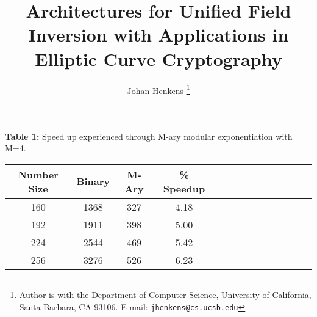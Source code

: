 \documentclass[twocolumn]{IEEEtran}
\begin{document}
\title{Architectures for Unified Field Inversion with Applications 
in Elliptic Curve Cryptography}


\author{Johan Henkens
\thanks{Author is with the
Department of Computer Science,
University of California, Santa Barbara, CA 93106.
E-mail: \texttt{jhenkens@cs.ucsb.edu}}
}

\maketitle



\begin{center}
\textbf{Table 1:} Speed up experienced through M-ary modular exponentiation with M=4. \\[1em]
\begin{tabular}{|c|c|c|c|c|c|c|c|c|c|c|c|c|c|} \hline
Number Size & Binary & M-Ary & \% Speedup  \\ \hline
160 & 1368  & 327 & 4.18 \\ \hline
192 & 1911  & 398 & 5.00 \\ \hline
224 & 2544  & 469 & 5.42 \\ \hline
256 & 3276  & 526 & 6.23 \\ \hline
\end{tabular}
\end{center}
\end{document}
